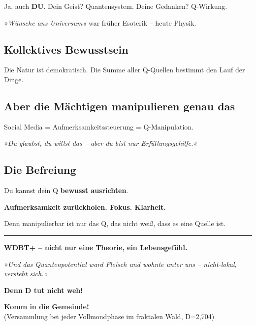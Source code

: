 \documentclass[10pt,a5paper]{article}
\begin{document}
Ja, auch \textbf{DU}. Dein Geist? Quantensystem. Deine Gedanken? Q-Wirkung.

\textit{»Wünsche ans Universum«} war früher Esoterik – heute Physik.

\subsection*{Kollektives Bewusstsein}

Die Natur ist demokratisch. Die Summe aller Q-Quellen bestimmt den Lauf der Dinge.

\subsection*{Aber die Mächtigen manipulieren genau das}

Social Media = Aufmerksamkeitssteuerung = Q-Manipulation.

\textit{»Du glaubst, du willst das – aber du bist nur Erfüllungsgehilfe.«}

\subsection*{Die Befreiung}

Du kannst dein Q \textbf{bewusst ausrichten}.

\begin{center}
    \large\textbf{Aufmerksamkeit zurückholen. Fokus. Klarheit.}
\end{center}

Denn manipulierbar ist nur das Q, das nicht weiß, dass es eine Quelle ist.

\vspace{0.3cm}
\hrule
\vspace{0.3cm}

\begin{center}
    {\Large\bfseries WDBT+ – nicht nur eine Theorie, ein Lebensgefühl.}
    
    \vspace{0.2cm}
    \small
    \textit{»Und das Quantenpotential ward Fleisch und wohnte unter uns – nicht-lokal, versteht sich.«}
    
    \vspace{0.2cm}
    \textbf{Denn D tut nicht weh!}
    
    \vspace{0.3cm}
    \textbf{Komm in die Gemeinde!} \\
    \small
    (Versammlung bei jeder Vollmondphase im fraktalen Wald, D=2,704)
\end{center}
\end{document}
